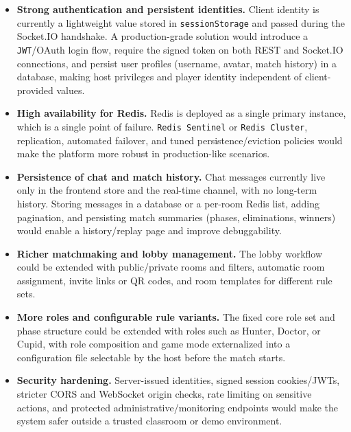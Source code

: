 \documentclass{scrartcl}
\begin{document}
\begin{itemize}
    \item \textbf{Strong authentication and persistent identities.} Client identity is
    currently a lightweight value stored in \texttt{sessionStorage} and passed during
    the Socket.IO handshake. A production-grade solution would introduce a
    \texttt{JWT}/OAuth login flow, require the signed token on both REST and
    Socket.IO connections, and persist user profiles (username, avatar, match
    history) in a database, making host privileges and player identity independent
    of client-provided values.

    \item \textbf{High availability for Redis.} Redis is deployed as a single
    primary instance, which is a single point of failure. \texttt{Redis Sentinel} or
    \texttt{Redis Cluster}, replication, automated failover, and tuned
    persistence/eviction policies would make the platform more robust in
    production-like scenarios.

    \item \textbf{Persistence of chat and match history.} Chat messages currently
    live only in the frontend store and the real-time channel, with no long-term
    history. Storing messages in a database or a per-room Redis list, adding
    pagination, and persisting match summaries (phases, eliminations, winners)
    would enable a history/replay page and improve debuggability.

    \item \textbf{Richer matchmaking and lobby management.} The lobby workflow could
    be extended with public/private rooms and filters, automatic room assignment,
    invite links or QR codes, and room templates for different rule sets.

    \item \textbf{More roles and configurable rule variants.} The fixed core role
    set and phase structure could be extended with roles such as Hunter, Doctor, or
    Cupid, with role composition and game mode externalized into a configuration
    file selectable by the host before the match starts.

    \item \textbf{Security hardening.} Server-issued identities, signed session
    cookies/JWTs, stricter CORS and WebSocket origin checks, rate limiting on
    sensitive actions, and protected administrative/monitoring endpoints would make
    the system safer outside a trusted classroom or demo environment.
\end{itemize}
\end{document}
